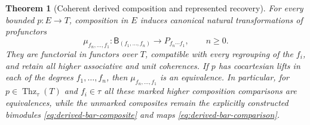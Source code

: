 \documentclass[oneside]{article}
\theoremstyle{plain}
\newtheorem{theorem}{Theorem}[section]
\theoremstyle{definition}
\theoremstyle{remark}
\newcommand{\Thz}{\operatorname{Thz}}
\begin{document}
\begin{theorem}[Coherent derived composition and represented recovery]
\label{thm:derived-higher-composition}
For every bounded $p:E\to T$, composition in $E$ induces canonical
natural transformations of profunctors
\begin{equation}\label{eq:derived-bar-comparison}
 \mu_{f_n,\ldots,f_1}:
 \mathsf B_{(f_1,\ldots,f_n)}
 \longrightarrow P_{f_n\cdots f_1},\qquad n\geq0.
\end{equation}
They are functorial in functors over $T$, compatible with every
regrouping of the $f_i$, and retain all higher associative and unit
coherences. If $p$ has cocartesian lifts in each of the degrees
$f_1,\ldots,f_n$, then $\mu_{f_n,\ldots,f_1}$ is an equivalence.
In particular, for $p\in\Thz_\tau(T)$ and $f_i\in\tau$ all these
marked higher composition comparisons are equivalences, while the
unmarked composites remain the explicitly constructed bimodules
\eqref{eq:derived-bar-composite} and maps
\eqref{eq:derived-bar-comparison}.
\end{theorem}
\end{document}
